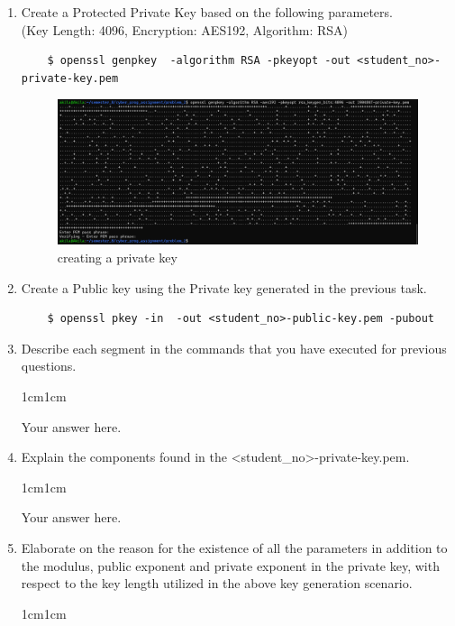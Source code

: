 \documentclass[11pt,letterpaper]{article}
\newenvironment{answer}{\em \color{blue} \begin{adjustwidth}{1cm}{1cm}}{\end{adjustwidth}}
\begin{document}
\begin{enumerate}

    \item Create a Protected Private Key based on the following parameters. \\(Key Length: 4096, Encryption: AES192, Algorithm: RSA) 
    \begin{Verbatim}
    $ openssl genpkey  -algorithm RSA -pkeyopt -out <student_no>-private-key.pem
    \end{Verbatim}

    \begin{figure}[h]
        \centering
        \includegraphics[width=\textwidth]{images/question_2-image_1.png}
        \caption{creating a private key}
        \label{fig:enter-label}
    \end{figure}
        
    \item Create a Public key using the Private key generated in the previous task. 
    \begin{Verbatim}
    $ openssl pkey -in  -out <student_no>-public-key.pem -pubout
    \end{Verbatim}

    \item Describe each segment in the commands that you have executed for previous questions. 
    \begin{answer}
	
		Your answer here.
		
	\end{answer}
     \item Explain the components found in the \textless student\_no\textgreater-private-key.pem. 
     \begin{answer}
	
		Your answer here.
		
	\end{answer}
    \item Elaborate on the reason for the existence of all the parameters in addition to the modulus, public exponent and private exponent in the private key, with respect to the key length utilized in the above key generation scenario.
    \begin{answer}
	

\end{answer}
\end{enumerate}
\end{document}
